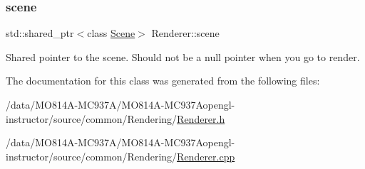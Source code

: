 \subsubsection{\texorpdfstring{scene}{scene}}
{\footnotesize\ttfamily std\+::shared\+\_\+ptr$<$class \hyperlink{class_scene}{Scene}$>$ Renderer\+::scene\hspace{0.3cm}{\ttfamily [protected]}}



Shared pointer to the scene. Should not be a null pointer when you go to render.



The documentation for this class was generated from the following files\+:\begin{DoxyCompactItemize}
\item
/data/MO814A-MC937A/MO814A-MC937Aopengl-\/instructor/source/common/\+Rendering/\hyperlink{_renderer_8h}{Renderer.\+h}\item
/data/MO814A-MC937A/MO814A-MC937Aopengl-\/instructor/source/common/\+Rendering/\hyperlink{_renderer_8cpp}{Renderer.\+cpp}\end{DoxyCompactItemize}
